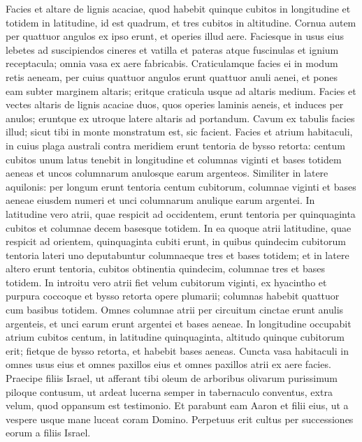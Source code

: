 \begin{biblechapter}  
\verse Facies et altare de lignis acaciae, quod habebit quinque cubitos in longitudine et totidem in latitudine, id est quadrum, et tres cubitos in altitudine. 
\verse Cornua autem per quattuor angulos ex ipso erunt, et operies illud aere. 
\verse Faciesque in usus eius lebetes ad suscipiendos cineres et vatilla et pateras atque fuscinulas et ignium receptacula; omnia vasa ex aere fabricabis. 
\verse Craticulamque facies ei in modum retis aeneam, per cuius quattuor angulos erunt quattuor anuli aenei, 
\verse et pones eam subter marginem altaris; eritque craticula usque ad altaris medium. 
\verse Facies et vectes altaris de lignis acaciae duos, quos operies laminis aeneis, 
\verse et induces per anulos; eruntque ex utroque latere altaris ad portandum. 
\verse Cavum ex tabulis facies illud; sicut tibi in monte monstratum est, sic facient. 
\verse Facies et atrium habitaculi, in cuius plaga australi contra meridiem erunt tentoria de bysso retorta: centum cubitos unum latus tenebit in longitudine  
\verse et columnas viginti et bases totidem aeneas et uncos columnarum anulosque earum argenteos. 
\verse Similiter in latere aquilonis: per longum erunt tentoria centum cubitorum, columnae viginti et bases aeneae eiusdem numeri et unci columnarum anulique earum argentei. 
\verse In latitudine vero atrii, quae respicit ad occidentem, erunt tentoria per quinquaginta cubitos et columnae decem basesque totidem. 
\verse In ea quoque atrii latitudine, quae respicit ad orientem, quinquaginta cubiti erunt, 
\verse in quibus quindecim cubitorum tentoria lateri uno deputabuntur columnaeque tres et bases totidem; 
\verse et in latere altero erunt tentoria, cubitos obtinentia quindecim, columnae tres et bases totidem. 
\verse In introitu vero atrii fiet velum cubitorum viginti, ex hyacintho et purpura coccoque et bysso retorta opere plumarii; columnas habebit quattuor cum basibus totidem. 
\verse Omnes columnae atrii per circuitum cinctae erunt anulis argenteis, et unci earum erunt argentei et bases aeneae. 
\verse In longitudine occupabit atrium cubitos centum, in latitudine quinquaginta, altitudo quinque cubitorum erit; fietque de bysso retorta, et habebit bases aeneas. 
\verse Cuncta vasa habitaculi in omnes usus eius et omnes paxillos eius et omnes paxillos atrii ex aere facies. 
\verse Praecipe filiis Israel, ut afferant tibi oleum de arboribus olivarum purissimum piloque contusum, ut ardeat lucerna semper 
\verse in tabernaculo conventus, extra velum, quod oppansum est testimonio. Et parabunt eam Aaron et filii eius, ut a vespere usque mane luceat coram Domino. Perpetuus erit cultus per successiones eorum a filiis Israel. 
\end{biblechapter}

